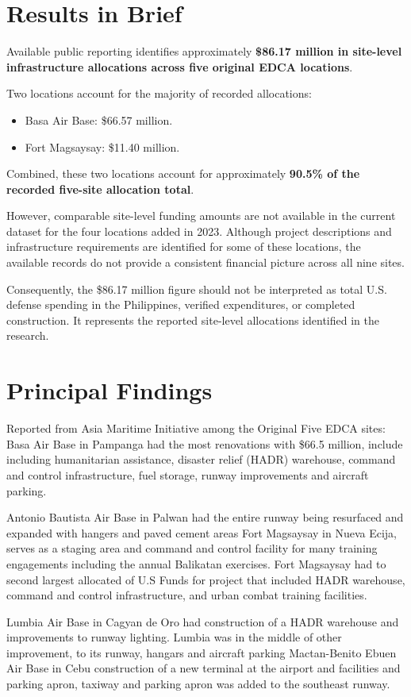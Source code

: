 \documentclass[11pt]{article}
\begin{document}
\section{Results in Brief}
Available public reporting identifies approximately \textbf{\$86.17 million in site-level infrastructure allocations across five original EDCA locations}.

Two locations account for the majority of recorded allocations:

\begin{itemize}
\item Basa Air Base: \$66.57 million.
\item Fort Magsaysay: \$11.40 million.
\end{itemize}

Combined, these two locations account for approximately \textbf{90.5\% of the recorded five-site allocation total}.

However, comparable site-level funding amounts are not available in the current dataset for the four locations added in 2023. Although project descriptions and infrastructure requirements are identified for some of these locations, the available records do not provide a consistent financial picture across all nine sites.

Consequently, the \$86.17 million figure should not be interpreted as total U.S. defense spending in the Philippines, verified expenditures, or completed construction. It represents the reported site-level allocations identified in the research.

\section{Principal Findings}
Reported from Asia Maritime Initiative among the Original Five EDCA sites: Basa Air Base in Pampanga had the most renovations with \$66.5 million, include including humanitarian assistance, disaster relief (HADR) warehouse, command and control infrastructure, fuel storage, runway improvements and aircraft parking.

Antonio Bautista Air Base in Palwan had the entire runway being resurfaced and expanded with hangers and paved cement areas Fort Magsaysay in Nueva Ecija, serves as a staging area and command and control facility for many training engagements including the annual Balikatan exercises. Fort Magsaysay had to second largest allocated of U.S Funds for project that included HADR warehouse, command and control infrastructure, and urban combat training facilities.

Lumbia Air Base in Cagyan de Oro had construction of a HADR warehouse and improvements to runway lighting. Lumbia was in the middle of other improvement, to its runway, hangars and aircraft parking Mactan-Benito Ebuen Air Base in Cebu construction of a new terminal at the airport and facilities and parking apron, taxiway and parking apron was added to the southeast runway.
\end{document}
